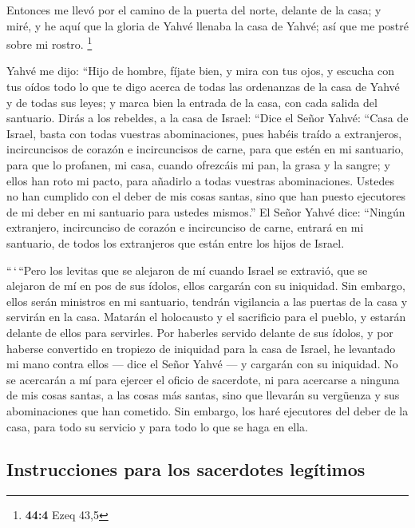  Entonces me llevó por el camino de la puerta del norte,
delante de la casa; y miré, y he aquí que la gloria de Yahvé llenaba la
casa de Yahvé; así que me postré sobre mi rostro. \footnote{\textbf{44:4}
  Ezeq 43,5}

 Yahvé me dijo: ``Hijo de hombre, fíjate bien, y mira con
tus ojos, y escucha con tus oídos todo lo que te digo acerca de todas
las ordenanzas de la casa de Yahvé y de todas sus leyes; y marca bien la
entrada de la casa, con cada salida del santuario.  Dirás
a los rebeldes, a la casa de Israel: ``Dice el Señor Yahvé: ``Casa de
Israel, basta con todas vuestras abominaciones,  pues
habéis traído a extranjeros, incircuncisos de corazón e incircuncisos de
carne, para que estén en mi santuario, para que lo profanen, mi casa,
cuando ofrezcáis mi pan, la grasa y la sangre; y ellos han roto mi
pacto, para añadirlo a todas vuestras abominaciones. 
Ustedes no han cumplido con el deber de mis cosas santas, sino que han
puesto ejecutores de mi deber en mi santuario para ustedes mismos.''
 El Señor Yahvé dice: ``Ningún extranjero, incircunciso de
corazón e incircunciso de carne, entrará en mi santuario, de todos los
extranjeros que están entre los hijos de Israel.

 ``\,`\,``Pero los levitas que se alejaron de mí cuando
Israel se extravió, que se alejaron de mí en pos de sus ídolos, ellos
cargarán con su iniquidad.  Sin embargo, ellos serán
ministros en mi santuario, tendrán vigilancia a las puertas de la casa y
servirán en la casa. Matarán el holocausto y el sacrificio para el
pueblo, y estarán delante de ellos para servirles.  Por
haberles servido delante de sus ídolos, y por haberse convertido en
tropiezo de iniquidad para la casa de Israel, he levantado mi mano
contra ellos --- dice el Señor Yahvé --- y cargarán con su iniquidad.
 No se acercarán a mí para ejercer el oficio de
sacerdote, ni para acercarse a ninguna de mis cosas santas, a las cosas
más santas, sino que llevarán su vergüenza y sus abominaciones que han
cometido.  Sin embargo, los haré ejecutores del deber de
la casa, para todo su servicio y para todo lo que se haga en ella.

\hypertarget{instrucciones-para-los-sacerdotes-leguxedtimos}{%
\subsection{Instrucciones para los sacerdotes
legítimos}\label{instrucciones-para-los-sacerdotes-leguxedtimos}}

